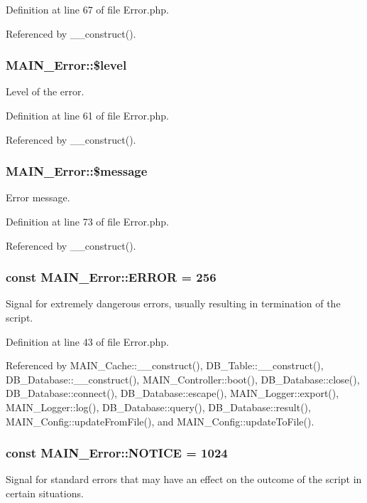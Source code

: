 Definition at line 67 of file Error.php.

Referenced by \_\-\_\-construct().\hypertarget{classMAIN__Error_acddcbb7c1ce7ac137b542542282ec4bc}{
\subsubsection[{\$level}]{\setlength{\rightskip}{0pt plus 5cm}MAIN\_\-Error::\$level}}
\label{d4/d5e/classMAIN__Error_acddcbb7c1ce7ac137b542542282ec4bc}
Level of the error. 

Definition at line 61 of file Error.php.

Referenced by \_\-\_\-construct().\hypertarget{classMAIN__Error_a7210e16c421fd1a44fa947273bff58b5}{
\subsubsection[{\$message}]{\setlength{\rightskip}{0pt plus 5cm}MAIN\_\-Error::\$message}}
\label{d4/d5e/classMAIN__Error_a7210e16c421fd1a44fa947273bff58b5}
Error message. 

Definition at line 73 of file Error.php.

Referenced by \_\-\_\-construct().\hypertarget{classMAIN__Error_a8dd94ca1db9a48b21bad30ed114e7fbe}{
\subsubsection[{ERROR}]{\setlength{\rightskip}{0pt plus 5cm}const {\bf MAIN\_\-Error::ERROR} = 256}}
\label{d4/d5e/classMAIN__Error_a8dd94ca1db9a48b21bad30ed114e7fbe}
Signal for extremely dangerous errors, usually resulting in termination of the script. 

Definition at line 43 of file Error.php.

Referenced by MAIN\_\-Cache::\_\-\_\-construct(), DB\_\-Table::\_\-\_\-construct(), DB\_\-Database::\_\-\_\-construct(), MAIN\_\-Controller::boot(), DB\_\-Database::close(), DB\_\-Database::connect(), DB\_\-Database::escape(), MAIN\_\-Logger::export(), MAIN\_\-Logger::log(), DB\_\-Database::query(), DB\_\-Database::result(), MAIN\_\-Config::updateFromFile(), and MAIN\_\-Config::updateToFile().\hypertarget{classMAIN__Error_a6566891abdf29792892d9cf42fcc496d}{
\subsubsection[{NOTICE}]{\setlength{\rightskip}{0pt plus 5cm}const {\bf MAIN\_\-Error::NOTICE} = 1024}}
\label{d4/d5e/classMAIN__Error_a6566891abdf29792892d9cf42fcc496d}
Signal for standard errors that may have an effect on the outcome of the script in certain situations. 

